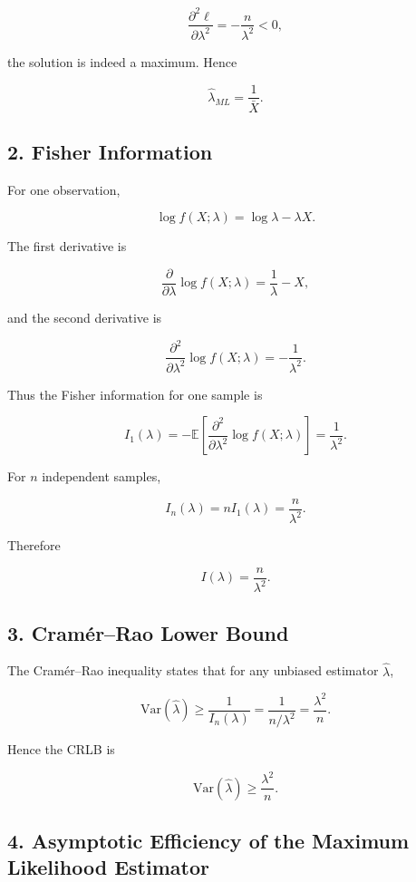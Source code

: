 \[
\frac{\partial^2 \ell}{\partial \lambda^2}
= -\frac{n}{\lambda^2} < 0,
\]

the solution is indeed a maximum. Hence

\[
\boxed{\hat{\lambda}_{ML} = \dfrac{1}{\bar X}}.
\]

\subsection*{2. Fisher Information}

For one observation,

\[
\log f(X;\lambda) = \log \lambda - \lambda X.
\]

The first derivative is

\[
\frac{\partial}{\partial \lambda} \log f(X;\lambda)
= \frac{1}{\lambda} - X,
\]

and the second derivative is

\[
\frac{\partial^2}{\partial \lambda^2} \log f(X;\lambda)
= -\frac{1}{\lambda^2}.
\]

Thus the Fisher information for one sample is

\[
I_1(\lambda)
= -\mathbb{E}\!\left[
\frac{\partial^2}{\partial \lambda^2} \log f(X;\lambda)
\right]
= \frac{1}{\lambda^{2}}.
\]

For \(n\) independent samples,

\[
I_n(\lambda) = n I_1(\lambda)
= \frac{n}{\lambda^{2}}.
\]

Therefore

\[
\boxed{I(\lambda) = \dfrac{n}{\lambda^2}}.
\]

\subsection*{3. Cramér--Rao Lower Bound}

The Cramér--Rao inequality states that for any unbiased estimator \(\hat{\lambda}\),

\[
\mathrm{Var}(\hat{\lambda})
\ge \frac{1}{I_n(\lambda)}
= \frac{1}{n/\lambda^{2}}
= \frac{\lambda^2}{n}.
\]

Hence the CRLB is

\[
\boxed{\mathrm{Var}(\hat{\lambda}) \ge \dfrac{\lambda^2}{n}}.
\]

\subsection*{4. Asymptotic Efficiency of the Maximum Likelihood Estimator}

